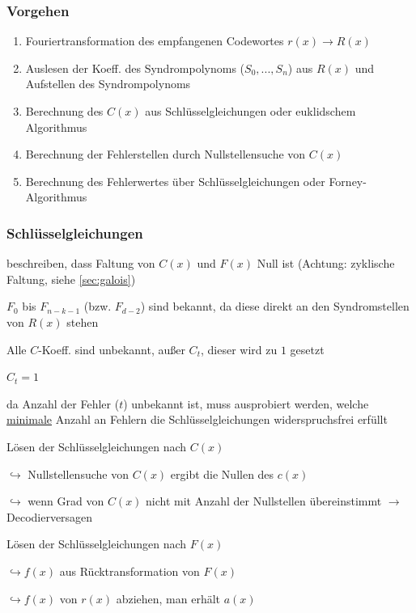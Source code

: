 \subsubsection{Vorgehen}

\begin{enumerate}
    \item Fouriertransformation des empfangenen Codewortes $r(x) \rightarrow R(x)$
    \item Auslesen der Koeff. des Syndrompolynoms ($S_0, ..., S_n$) aus $R(x)$ und Aufstellen des Syndrompolynoms
    \item Berechnung des $C(x)$ aus Schlüsselgleichungen oder euklidschem Algorithmus
    \item Berechnung der Fehlerstellen durch Nullstellensuche von $C(x)$
    \item Berechnung des Fehlerwertes über Schlüsselgleichungen oder Forney-Algorithmus
\end{enumerate}

\subsubsection{Schlüsselgleichungen}

beschreiben, dass Faltung von $C(x)$ und $F(x)$ Null ist (Achtung: zyklische Faltung, siehe \autoref{sec:galois})

$F_0$ bis $F_{n-k-1}$ (bzw. $F_{d-2}$) sind bekannt, da diese direkt an den Syndromstellen
von $R(x)$ stehen

Alle $C$-Koeff. sind unbekannt, außer $C_{t}$, dieser wird zu $1$ gesetzt

$\displaystyle{
    C_{t} = 1
}$

da Anzahl der Fehler ($t$) unbekannt ist, muss ausprobiert werden, welche \underline{minimale} Anzahl an Fehlern
die Schlüsselgleichungen widerspruchsfrei erfüllt

Lösen der Schlüsselgleichungen nach $C(x)$

$\hookrightarrow$ Nullstellensuche von $C(x)$ ergibt die Nullen des $c(x)$

$\hookrightarrow$ wenn Grad von $C(x)$ nicht mit Anzahl der Nullstellen übereinstimmt $\rightarrow$ Decodierversagen

Lösen der Schlüsselgleichungen nach $F(x)$

$\hookrightarrow f(x)$ aus Rücktransformation von $F(x)$

$\hookrightarrow f(x)$ von $r(x)$ abziehen, man erhält $a(x)$

